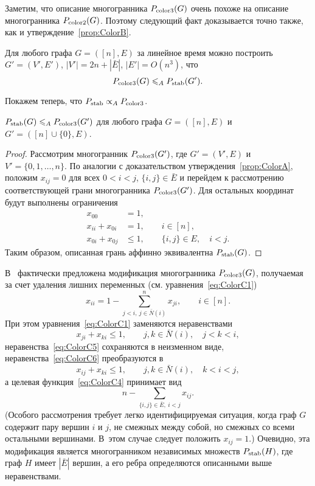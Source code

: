 Заметим, что описание многогранника $P_{\textup{color3}}(G)$ очень похоже на описание многогранника $P_{\textup{color2}}(G)$.
Поэтому следующий факт доказывается точно также, как и утверждение~\ref{prop:ColorB}.

\begin{prop}\label{prop:ColorC}
	Для любого графа $G=([n],E)$ за линейное время можно построить $G'=(V',E')$, $|V'| = 2n+|\bar{E}|$, $|E'|=O(n^3)$, что 
	\[
	P_{\textup{color3}}(G) \leqslant_A P_{\textup{stab}}(G').
	\]
\end{prop}

Покажем теперь, что $P_{\textup{stab}} \propto_A P_{\textup{color3}}$.

\begin{prop}
	$P_{\textup{stab}}(G) \leqslant_A P_{\textup{color3}}(G')$ для любого графа $G=([n],E)$ и $G'=([n]\cup\{0\}, E)$.
\end{prop}
\begin{proof}
	Рассмотрим многогранник $P_{\textup{color3}}(G')$, где $G' = (V', E)$ и $V' = \{0,1,\dots,n\}$.
	По аналогии с доказательством утверждения~\ref{prop:ColorA},
	положим $x_{ij} = 0$ для всех $0 < i < j$, $\{i,j\} \in \bar{E}$
	и перейдем к рассмотрению соответствующей грани многогранника $P_{\textup{color3}}(G')$.
	Для остальных координат будут выполнены ограничения
	\begin{align*}
	x_{00} &= 1,\\
	x_{ii} + x_{0i} &= 1, \qquad i\in[n],\\
	x_{0i} + x_{0j} &\le 1, \qquad \{i,j\} \in E, \quad i < j.
	\end{align*}
	Таким образом, описанная грань аффинно эквивалентна $P_{\textup{stab}}(G)$.
\end{proof}

В~\cite{Palubeckis:2008,Cornaz:2008} фактически предложена модификация многогранника $P_{\textup{color3}}(G)$, получаемая за счет удаления лишних переменных
(см. уравнения~\eqref{eq:ColorC1})
\[
x_{ii} = 1 - \sum_{j<i, \ j\in\bar{N}(i)}^n x_{ji}, \qquad i\in[n]. 
\]
При этом уравнения~\eqref{eq:ColorC1} заменяются неравенствами
\[
x_{ji} + x_{ki} \le 1, \qquad j,k\in\bar{N}(i), \quad j < k < i,
\]
неравенства~\eqref{eq:ColorC5} сохраняются в неизменном виде, неравенства~\eqref{eq:ColorC6} преобразуются в
\[
x_{ij} + x_{ki} \le 1, \qquad j,k \in \bar{N}(i), \quad k < i < j, 
\]
а целевая функция~\eqref{eq:ColorC4} принимает вид
\[
n - \sum_{\{i,j\}\in \bar{E}, \ i<j} x_{ij}.
\]
(Особого рассмотрения требует легко идентифицируемая ситуация, когда граф $G$ содержит пару вершин $i$ и $j$, не смежных между собой, но смежных со всеми остальными вершинами. В~этом случае следует положить $x_{ij} = 1$.)
Очевидно, эта модификация является многогранником независимых множеств $P_{\textup{stab}}(H)$, где граф $H$ имеет $|\bar{E}|$ вершин, а его ребра определяются описанными выше неравенствами.

